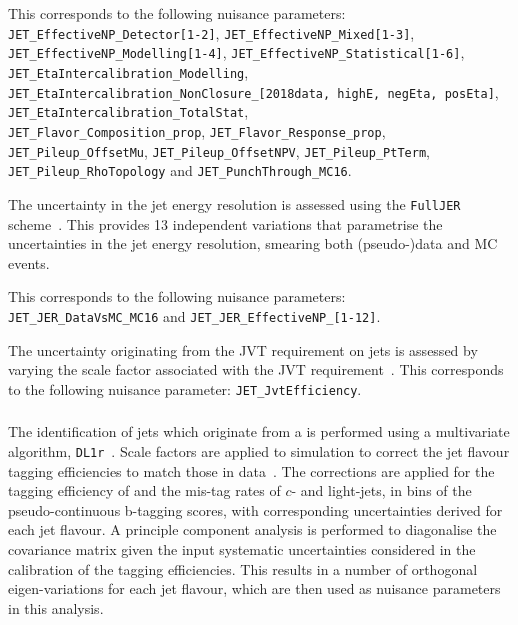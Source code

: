 This corresponds to the following nuisance parameters:\\
\texttt{JET\_EffectiveNP\_Detector[1-2]},  %
\texttt{JET\_EffectiveNP\_Mixed[1-3]},\\  %
\texttt{JET\_EffectiveNP\_Modelling[1-4]},  %
\texttt{JET\_EffectiveNP\_Statistical[1-6]},\\  %
\texttt{JET\_EtaIntercalibration\_Modelling},\\
\texttt{JET\_EtaIntercalibration\_NonClosure\_[2018data, highE, negEta, posEta]},\\
\texttt{JET\_EtaIntercalibration\_TotalStat},\\
\texttt{JET\_Flavor\_Composition\_prop},
\texttt{JET\_Flavor\_Response\_prop},\\
\texttt{JET\_Pileup\_OffsetMu},
\texttt{JET\_Pileup\_OffsetNPV},
\texttt{JET\_Pileup\_PtTerm},\\
\texttt{JET\_Pileup\_RhoTopology} and
\texttt{JET\_PunchThrough\_MC16}.

The uncertainty in the jet energy resolution is assessed using the \texttt{FullJER}
scheme~\cite{web:JetSystematics}. This provides 13 independent variations that parametrise
the uncertainties in the jet energy resolution, smearing both (pseudo-)data  %
and MC events.

This corresponds to the following nuisance parameters:\\
\texttt{JET\_JER\_DataVsMC\_MC16} and
\texttt{JET\_JER\_EffectiveNP\_[1-12]}.  %

The uncertainty originating from the JVT requirement on jets is assessed by
varying the scale factor associated with the JVT requirement~\cite{ATLAS-CONF-2014-018}.
This corresponds to the following nuisance parameter:
\texttt{JET\_JvtEfficiency}.

\subsubsection{\btag}%
\label{sec:systematics:btag}
The identification of jets which originate from a \bhadron is performed using
a multivariate algorithm, \texttt{DL1r}~\cite{web:FlavourTagging}.
Scale factors are applied to simulation to correct the jet flavour tagging
efficiencies to match those in data~\cite{FTAG-2018-01, ATLAS-CONF-2018-001, ATLAS-CONF-2018-006}.
The corrections are applied for the tagging efficiency of \bjets and
the mis-tag rates of \(c\)- and light-jets, in bins of the pseudo-continuous b-tagging scores,
with corresponding uncertainties derived for each jet flavour.
A principle component analysis is performed to diagonalise the covariance
matrix given the input systematic uncertainties considered in the calibration
of the tagging efficiencies. This results in a number of orthogonal eigen-variations
for each jet flavour, which are then used as nuisance parameters in this analysis.

